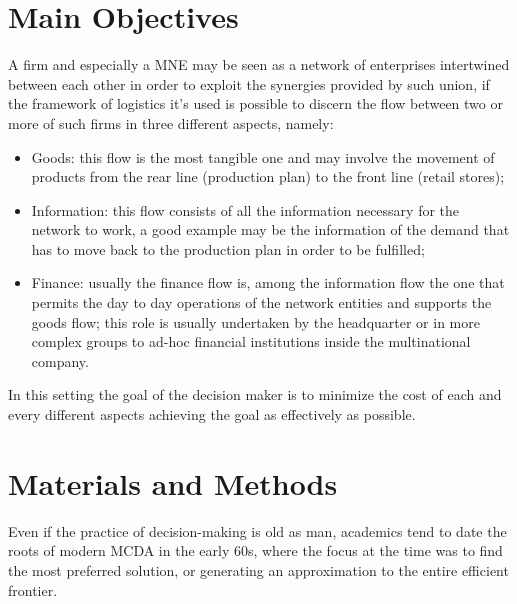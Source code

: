 \documentclass[a0,portrait]{a0poster}
\begin{document}
\begin{multicols}{2}
\color{DarkSlateGray} %

\section*{Main Objectives}

A firm and especially a MNE may be seen as a network of enterprises intertwined between each other in order to exploit the synergies provided by such union, if the framework of logistics it's used is possible to discern the flow between two or more of such firms in three different aspects, namely:

\begin{itemize}
 \item Goods: this flow is the most tangible one and may involve the movement of products from the rear line (production plan) to the front line (retail stores);    
\item Information: this flow consists of all the information necessary for the network to work, a good example may be the information of the demand that has to move back to the production plan in order to be fulfilled;
\item Finance: usually the finance flow is, among the information flow the one that permits the day to day operations of the network entities and supports the goods flow; this role is usually undertaken by the headquarter or in more complex groups to ad-hoc financial institutions inside the multinational company. 
\end{itemize}
In this setting the goal of the decision maker is to minimize the cost of each and every different aspects achieving the goal as effectively as possible.


\section*{Materials and Methods}
Even if the practice of decision-making is old as man, academics tend to date the roots of modern MCDA in the early 60s, where the focus at the time was to find the most preferred solution, or generating an approximation to the entire efficient frontier\cite{Greco2016}.
\



\end{multicols}
\end{document}
